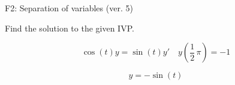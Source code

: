 \begin{exercise}
  \begin{exerciseTitle}F2: Separation of variables (ver. 5)\end{exerciseTitle}
  \begin{exerciseStatement}
    
Find the solution to the given IVP.

    
\[\cos\left(t\right) y= \sin\left(t\right) y'\hspace{1em} y\left( \frac{1}{2} \, \pi \right)= -1\]

  \end{exerciseStatement}
  \begin{exerciseAnswer}
    
\[y= -\sin\left(t\right)\]

  \end{exerciseAnswer}
\end{exercise}